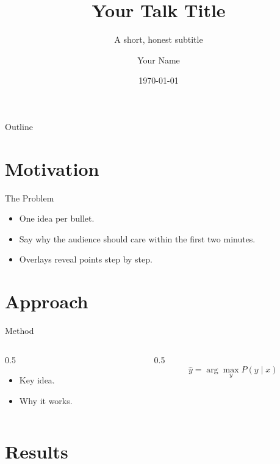 \documentclass[aspectratio=169]{beamer}
\title{Your Talk Title}
\subtitle{A short, honest subtitle}
\author{Your Name}
\institute{Your Institution}
\date{\today}
\begin{document}
\begin{frame}
  \titlepage
\end{frame}

\begin{frame}{Outline}
  \tableofcontents
\end{frame}

\section{Motivation}

\begin{frame}{The Problem}
  \begin{itemize}
    \item One idea per bullet.
    \item Say why the audience should care within the first two minutes.
    \item<2-> Overlays reveal points step by step.
  \end{itemize}
\end{frame}

\section{Approach}

\begin{frame}{Method}
  \begin{columns}[T]
    \begin{column}{0.5\textwidth}
      \begin{itemize}
        \item Key idea.
        \item Why it works.
      \end{itemize}
    \end{column}
    \begin{column}{0.5\textwidth}
      \begin{equation*}
        \hat{y} = \arg\max_{y} P(y \mid x)
      \end{equation*}
    \end{column}
  \end{columns}
\end{frame}

\section{Results}
\end{document}

